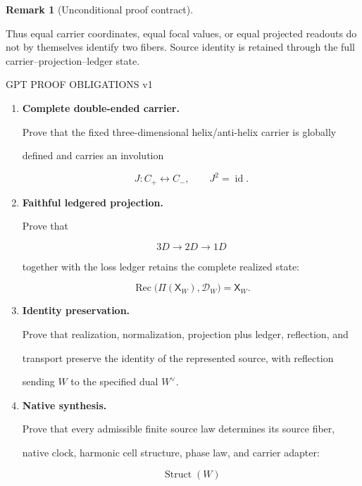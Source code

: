 \documentclass[11pt]{article}
\theoremstyle{definition}
\newtheorem{remark}[theorem]{Remark}
\begin{document}
\begin{remark}[Unconditional proof contract]
\begin{enumerate}
Thus equal carrier coordinates, equal focal values, or equal projected
readouts do not by themselves identify two fibers.  Source identity is retained
through the full carrier--projection--ledger state.


GPT PROOF OBLIGATIONS v1 
\begin{enumerate}

\item[\textup{(G1)}] \textbf{Complete double-ended carrier.}

Prove that the fixed three-dimensional helix/anti-helix carrier is globally

defined and carries an involution

\[

J:C_+\longleftrightarrow C_-,

\qquad

J^2=\operatorname{id}.

\]

\item[\textup{(G2)}] \textbf{Faithful ledgered projection.}

Prove that

\[

3D\longrightarrow2D\longrightarrow1D

\]

together with the loss ledger retains the complete realized state:

\[

\operatorname{Rec}\bigl(\Pi(\mathsf X_W),\mathscr D_W\bigr)

=

\mathsf X_W.

\]

\item[\textup{(G3)}] \textbf{Identity preservation.}

Prove that realization, normalization, projection plus ledger, reflection, and

transport preserve the identity of the represented source, with reflection

sending \(W\) to the specified dual \(W^\vee\).

\item[\textup{(G4)}] \textbf{Native synthesis.}

Prove that every admissible finite source law determines its source fiber,

native clock, harmonic cell structure, phase law, and carrier adapter:

\[

\operatorname{Struct}(W)

\]
\end{enumerate}
\end{enumerate}
\end{remark}
\end{document}
